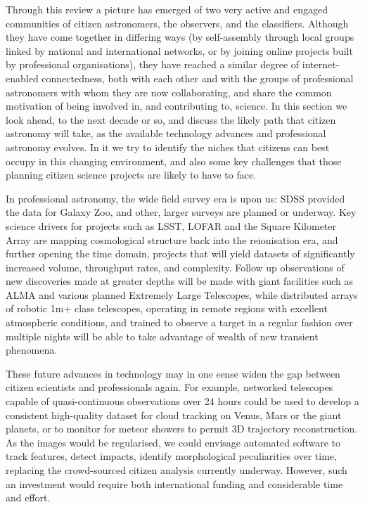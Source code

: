 \documentclass{ar2e}
\begin{document}
Through this review a picture has emerged of two very active and engaged
communities of citizen astronomers, the observers, and the classifiers. 
Although they have come together in differing ways (by self-assembly through
local groups linked by national and international networks, or by joining online
projects built by professional organisations), they have reached a similar
degree of internet-enabled connectedness, both with each other and with the
groups of professional astronomers with whom they are now collaborating, and
share the common motivation of being involved in, and contributing to, science.
In this section we look ahead, to the next decade or so, and discuss the likely
path that citizen astronomy will take, as the available technology advances and
professional astronomy evolves. In it we try to identify the niches that
citizens can best occupy in this changing environment, and also some key
challenges that those planning citizen science projects are likely to have to
face.



In professional astronomy, the wide field survey era is upon us: SDSS provided
the data for Galaxy Zoo, and other, larger surveys are planned or underway. Key
science drivers for projects such as LSST, LOFAR and the Square Kilometer Array
are mapping cosmological structure back into the reionisation era, and  further
opening the time domain, projects that will yield datasets of significantly
increased volume, throughput rates, and complexity.  Follow up observations of
new discoveries made at greater depths will be made with giant facilities such
as ALMA and various planned Extremely Large Telescopes, while distributed arrays
of robotic 1m+ class telescopes, operating in remote regions with excellent
atmospheric conditions, and trained to observe a target in a regular fashion
over multiple nights will be able to take advantage of wealth of new transient
phenomena. 

These future advances in technology may in one sense widen the gap between
citizen scientists and professionals again. For example, networked telescopes
capable of quasi-continuous observations over 24 hours could be used to develop
a consistent high-quality dataset for cloud tracking on Venus, Mars or the giant
planets, or to monitor for meteor showers to permit 3D trajectory
reconstruction.   As the images would be regularised, we could envisage
automated software to track features, detect impacts, identify morphological
peculiarities over time, replacing the crowd-sourced citizen analysis currently
underway.  However, such an investment would require both international funding
and considerable time and effort.
\end{document}
